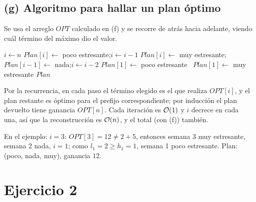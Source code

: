 \subsection*{(g) Algoritmo para hallar un plan óptimo}

Se usa el arreglo $OPT$ calculado en (f) y se recorre de atrás hacia adelante, viendo cuál término del máximo dio el valor.

\begin{algorithm}[H]
\caption{Plan de trabajo óptimo}
\begin{algorithmic}[1]
  \State $i\gets n$
      \State $Plan[i]\gets$ poco estresante;\quad $i\gets i-1$
    \Else {}
      \State $Plan[i]\gets$ muy estresante;\quad $Plan[i-1]\gets$ nada;\quad $i\gets i-2$
    \EndIf
  \EndWhile
     $Plan[1]\gets$ poco estresante \Else\ $Plan[1]\gets$ muy estresante \EndIf
  \EndIf
  \State \Return $Plan$
\EndFunction
\end{algorithmic}
\end{algorithm}

Por la recurrencia, en cada paso el término elegido es el que realiza $OPT[i]$, y el plan restante es óptimo para el prefijo correspondiente; por inducción el plan devuelto tiene ganancia $OPT[n]$. Cada iteración es $\mathcal{O}(1)$ y $i$ decrece en cada una, así que la reconstrucción es $\mathcal{O}(n)$, y el total (con (f)) también.

En el ejemplo: $i=3$: $OPT[3]=12\ne 2+5$, entonces semana 3 muy estresante, semana 2 nada, $i=1$; como $l_1=2\ge h_1=1$, semana 1 poco estresante. Plan: (poco, nada, muy), ganancia $12$.

\section{Ejercicio 2}


